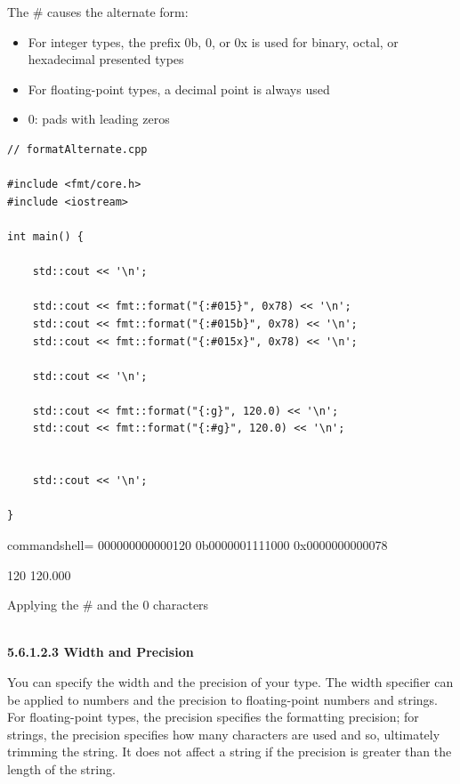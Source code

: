 The \# causes the alternate form:

\begin{itemize}
\item 
For integer types, the prefix 0b, 0, or 0x is used for binary, octal, or hexadecimal presented types

\item 
For floating-point types, a decimal point is always used

\item 
0: pads with leading zeros
\end{itemize}

\begin{lstlisting}[style=styleCXX]
// formatAlternate.cpp

#include <fmt/core.h>
#include <iostream>

int main() {

	std::cout << '\n';
	
	std::cout << fmt::format("{:#015}", 0x78) << '\n';
	std::cout << fmt::format("{:#015b}", 0x78) << '\n';
	std::cout << fmt::format("{:#015x}", 0x78) << '\n';
	
	std::cout << '\n';
	
	std::cout << fmt::format("{:g}", 120.0) << '\n';
	std::cout << fmt::format("{:#g}", 120.0) << '\n';
	
	
	std::cout << '\n';

}
\end{lstlisting}

\begin{tcblisting}{commandshell={}}
000000000000120
0b0000001111000
0x0000000000078

120
120.000
\end{tcblisting}

\begin{center}
Applying the \# and the 0 characters
\end{center}

\hspace*{\fill} \\ %
\noindent
\textbf{5.6.1.2.3\hspace{0.2cm} Width and Precision}

You can specify the width and the precision of your type. The width specifier can be applied to numbers and the precision to floating-point numbers and strings. For floating-point types, the precision specifies the formatting precision; for strings, the precision specifies how many characters are used and so, ultimately trimming the string. It does not affect a string if the precision is greater than the length of the string.

